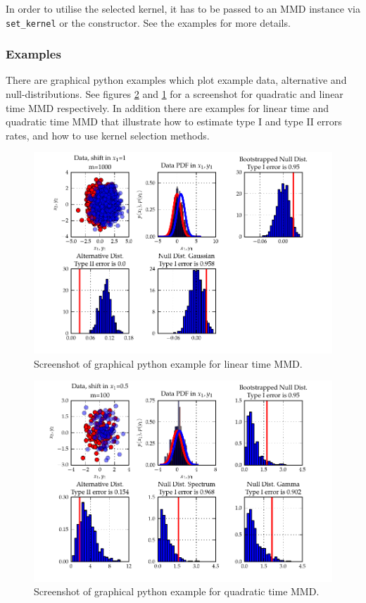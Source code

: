 In order to utilise the selected kernel, it has to be passed to an MMD instance via \texttt{set\_kernel} or the constructor. See the examples for more details.

\subsubsection{Examples}
There are graphical python examples which plot example data, alternative and null-distributions. See figures \ref{fig:statistical_testing-quadratic_time_mmd} and \ref{fig:statistical_testing-linear_time_mmd} for a screenshot for quadratic and linear time MMD respectively. In addition there are examples for linear time and quadratic time MMD that illustrate how to estimate type I and type II errors rates, and how to use kernel selection methods.

\begin{figure}\centering
		\includegraphics{fig/statistical_testing/linear_time_mmd}
		\caption{Screenshot of graphical python example for linear time MMD.}
		\label{fig:statistical_testing-linear_time_mmd}
\end{figure}

\begin{figure}\centering
		\includegraphics{fig/statistical_testing/quadratic_time_mmd}
		\caption{Screenshot of graphical python example for quadratic time MMD.}
		\label{fig:statistical_testing-quadratic_time_mmd}
\end{figure}